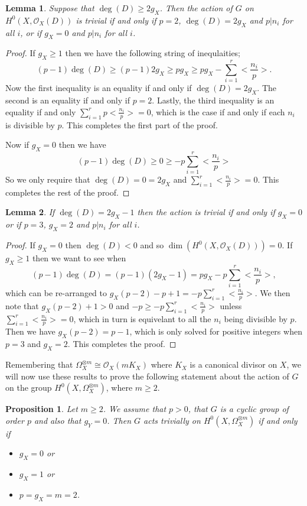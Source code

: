 \documentclass[11pt]{article} %
\newtheorem{lem}{Lemma}
\newtheorem{prop}{Proposition}
\begin{document}
\begin{lem}
Suppose that $\deg(D)\geq 2g_X$. Then the action of $G$ on $H^0(X,\mathscr{O}_X(D))$ is trivial if and only if $p=2$, $\deg(D)=2g_X$ and $p | n_i$ for all $i$, or if $g_X=0$ and $p | n_i$ for all $i$.
\end{lem}
\begin{proof}
If $g_X \geq 1$ then we have the following string of inequlaities;
	\[
		(p-1)\deg(D)\geq (p-1)2g_X \geq pg_X \geq pg_X-\sum_{i=1}^r\Big<\frac{n_i}{p}\Big>.
	\]
Now the first inequality is an equality if and only if $\deg(D)=2g_X$. The second is an equality if and only if $p=2$. Lastly, the third inequality is an equality if and only $\sum_{i=1}^rp\Big<\frac{n_i}{p}\Big>=0$, which is the case if and only if each $n_i$ is divisible by $p$. This completes the first part of the proof.

Now if $g_X=0$ then we have 
	\[
		(p-1)\deg(D)\geq 0 \geq -p\sum_{i=1}^r\Big<\frac{n_i}{p}\Big>
	\]
So we only require that $\deg(D)=0=2g_X$ and $\sum_{i=1}^r\Big<\frac{n_i}{p}\Big>=0$. This completes the rest of the proof.
\end{proof}

\begin{lem}
If $\deg(D)=2g_X-1$ then the action is trivial if and only if $g_X=0$ or if $p=3$, $g_X=2$ and $p|n_i$ for all $i$.
\end{lem}
\begin{proof}
If $g_X=0$ then $\deg(D)<0$ and so $\dim(H^0(X,\mathscr{O}_X(D)))=0$. If $g_X\geq1$ then we want to see when 
	\[
		(p-1)\deg(D)=(p-1)(2g_X-1)=pg_X-p\sum_{i=1}^r\Big<\frac{n_i}{p}\Big>,
	\]
which can be re-arranged to $g_X(p-2)-p+1=-p\sum_{i=1}^r\Big<\frac{n_i}{p}\Big>$. We then note that $g_X(p-2)+1>0$ and $-p\geq -p\sum_{i=1}^r\Big<\frac{n_i}{p}\Big>$ unless $\sum_{i=1}^r\Big<\frac{n_i}{p}\Big>=0$, which in turn is equivelant to all the $n_i$ being divisible by $p$. Then we have $g_X(p-2)=p-1$, which is only solved for positive integers when $p=3$ and $g_X=2$. This completes the proof.
\end{proof}

Remembering that $\Omega_X^{\otimes m}\cong \mathscr{O}_X(mK_X)$ where $K_X$ is a canonical divisor on $X$, we will now use these results to prove the following statement about the action of $G$ on the group $H^0(X,\Omega_X^{\otimes m})$, where $m\geq 2$. \\

\begin{prop}
Let $m\geq 2$. We assume that $p>0$, that $G$ is a cyclic group of order $p$ and also that $g_Y=0$. Then $G$ acts trivially on $H^0(X,\Omega_X^{\otimes m})$ if and only if
	\begin{itemize}
		\item
			$g_X=0$ or
		\item
			$g_X=1$ or
		\item
			$p=g_X=m=2$.
	\end{itemize}
\end{prop}
\end{document}
